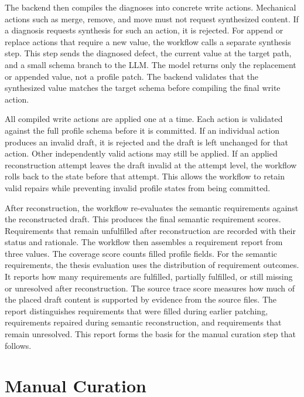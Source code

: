 The backend then compiles the diagnoses into concrete write actions.
Mechanical actions such as merge, remove, and move must not request synthesized content.
If a diagnosis requests synthesis for such an action, it is rejected.
For append or replace actions that require a new value, the workflow calls a separate synthesis step.
This step sends the diagnosed defect, the current value at the target path, and a small schema branch to the \ac{LLM}.
The model returns only the replacement or appended value, not a profile patch.
The backend validates that the synthesized value matches the target schema before compiling the final write action.

All compiled write actions are applied one at a time.
Each action is validated against the full profile schema before it is committed.
If an individual action produces an invalid draft, it is rejected and the draft is left unchanged for that action.
Other independently valid actions may still be applied.
If an applied reconstruction attempt leaves the draft invalid at the attempt level, the workflow rolls back to the state before that attempt.
This allows the workflow to retain valid repairs while preventing invalid profile states from being committed.

After reconstruction, the workflow re-evaluates the semantic requirements against the reconstructed draft.
This produces the final semantic requirement scores.
Requirements that remain unfulfilled after reconstruction are recorded with their status and rationale.
The workflow then assembles a requirement report from three values.
The coverage score counts filled profile fields.
For the semantic requirements, the thesis evaluation uses the distribution of requirement outcomes.
It reports how many requirements are fulfilled, partially fulfilled, or still missing or unresolved after reconstruction.
The source trace score measures how much of the placed draft content is supported by evidence from the source files.
The report distinguishes requirements that were filled during earlier patching, requirements repaired during semantic reconstruction, and requirements that remain unresolved.
This report forms the basis for the manual curation step that follows.

\section{Manual Curation}
\label{sec:manual_curation}

